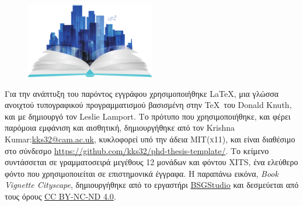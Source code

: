 \newpage
\thispagestyle{empty}
\begin{figure}
  \vspace{50pt}
  \centering
    \includegraphics[width=0.50\textwidth]{endmatter/colophon1.png}
\end{figure}


\begin{center}
\parbox{200pt}{\lettrine[lines=3,slope=-2pt,nindent=3pt]{\textcolor{SchoolColor}{Γ}}ια την ανάπτυξη του παρόντος εγγράφου χρησιμοποιήθηκε \LaTeX, μια γλώσσα ανοιχτού τυπογραφικού προγραμματισμού βασισμένη στην \TeX \, του Donald Knuth, και με δημιουργό τον Leslie Lamport. Το πρότυπο που χρησιμοποιήθηκε, και φέρει παρόμοια εμφάνιση και αισθητική, δημιουργήθηκε από τον Krishna Kumar:\href{mailto:kks32@cam.ac.uk}{kks32@cam.ac.uk}, κυκλοφορεί υπό την άδεια \textsc{MIT}(\textsc{x}11), και είναι διαθέσιμο στο σύνδεσμο \url{https://github.com/kks32/phd-thesis-template/}. Το κείμενο συντάσσεται σε γραμματοσειρά μεγέθους 12 μονάδων και φόντου XITS, ένα ελεύθερο φόντο που χρησιμοποιείται σε επιστημονικά έγγραφα. Η παραπάνω εικόνα, \textit{Book Vignette Cityscape}, δημιουργήθηκε από το εργαστήρι \href{http://buysellgraphic.com/vector-graphic/download/background_vector_illustration_with_book_and_vignette_cityscape_26398.html}{BSGStudio} και δεσμεύεται από τους όρους \href{https://creativecommons.org/licenses/by/4.0/deed.en}{\textsc{CC BY-NC-ND 4.0}}.}
\end{center}